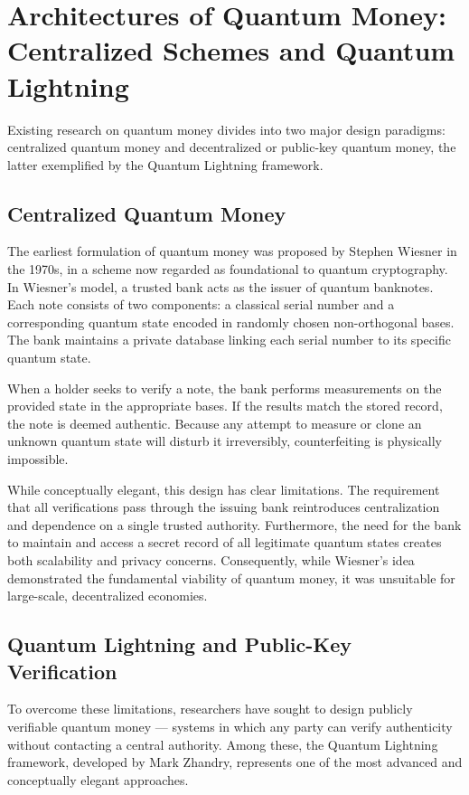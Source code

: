 \documentclass[a4paper,10.5pt,twoside]{article}
\begin{document}
\section{Architectures of Quantum Money: Centralized Schemes and Quantum Lightning}\label{s:2}
Existing research on quantum money divides into two major design paradigms: centralized quantum money and decentralized or public-key quantum money, the latter exemplified by the Quantum Lightning framework.

\subsection{Centralized Quantum Money}\label{s:2.1}

The earliest formulation of quantum money was proposed by Stephen Wiesner in the 1970s, in a scheme now regarded as foundational to quantum cryptography. In Wiesner's model, a trusted bank acts as the issuer of quantum banknotes. Each note consists of two components: a classical serial number and a corresponding quantum state encoded in randomly chosen non-orthogonal bases. The bank maintains a private database linking each serial number to its specific quantum state.

When a holder seeks to verify a note, the bank performs measurements on the provided state in the appropriate bases. If the results match the stored record, the note is deemed authentic. Because any attempt to measure or clone an unknown quantum state will disturb it irreversibly, counterfeiting is physically impossible.

While conceptually elegant, this design has clear limitations. The requirement that all verifications pass through the issuing bank reintroduces centralization and dependence on a single trusted authority. Furthermore, the need for the bank to maintain and access a secret record of all legitimate quantum states creates both scalability and privacy concerns. Consequently, while Wiesner's idea demonstrated the fundamental viability of quantum money, it was unsuitable for large-scale, decentralized economies.
\subsection{Quantum Lightning and Public-Key Verification}\label{s:2.2}
To overcome these limitations, researchers have sought to design publicly verifiable quantum money — systems in which any party can verify authenticity without contacting a central authority. Among these, the Quantum Lightning framework, developed by Mark Zhandry, represents one of the most advanced and conceptually elegant approaches.
\end{document}

